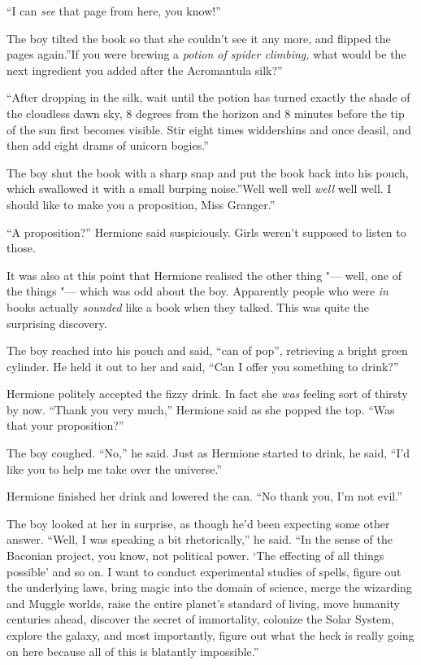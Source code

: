 ``I can \emph{see} that page from here, you know!''

The boy tilted the book so that she couldn't see it any more, and
flipped the pages again.''If you were brewing a \emph{potion of spider
climbing,} what would be the next ingredient you added after the
Acromantula silk?''

``After dropping in the silk, wait until the potion has turned exactly
the shade of the cloudless dawn sky, 8 degrees from the horizon and 8
minutes before the tip of the sun first becomes visible. Stir eight
times widdershins and once deasil, and then add eight drams of unicorn
bogies.''

The boy shut the book with a sharp snap and put the book back into his
pouch, which swallowed it with a small burping noise.''Well well well
\emph{well} well well. I should like to make you a proposition, Miss
Granger.''

``A proposition?'' Hermione said suspiciously. Girls weren't supposed to
listen to those.

It was also at this point that Hermione realised the other thing "--- well,
one of the things "--- which was odd about the boy. Apparently people who
were \emph{in} books actually \emph{sounded} like a book when they
talked. This was quite the surprising discovery.

The boy reached into his pouch and said, ``can of pop'', retrieving a
bright green cylinder. He held it out to her and said, ``Can I offer you
something to drink?''

Hermione politely accepted the fizzy drink. In fact she \emph{was}
feeling sort of thirsty by now. ``Thank you very much,'' Hermione said
as she popped the top. ``Was that your proposition?''

The boy coughed. ``No,'' he said. Just as Hermione started to drink, he
said, ``I'd like you to help me take over the universe.''

Hermione finished her drink and lowered the can. ``No thank you, I'm not
evil.''

The boy looked at her in surprise, as though he'd been expecting some
other answer. ``Well, I was speaking a bit rhetorically,'' he said. ``In
the sense of the Baconian project, you know, not political power. `The
effecting of all things possible' and so on. I want to conduct
experimental studies of spells, figure out the underlying laws, bring
magic into the domain of science, merge the wizarding and Muggle worlds,
raise the entire planet's standard of living, move humanity centuries
ahead, discover the secret of immortality, colonize the Solar System,
explore the galaxy, and most importantly, figure out what the heck is
really going on here because all of this is blatantly impossible.''

